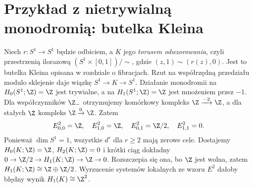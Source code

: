 \section{Przykład z nietrywialną monodromią: butelka Kleina}
Niech $r:S^1\to S^1$ będzie odbiciem, a $K$ jego
\emph{torusem odwzorowania}, czyli przestrzenią ilorazową
$(S^1\times[0,1])/{\sim}$, gdzie $(z,1)\sim(r(z),0)$.
Jest to butelka Kleina opisana w rozdziale o fibracjach.
Rzut na współrzędną przedziału modulo sklejenie daje
wiązkę $S^1\to K\to S^1$. Działanie monodromii
na $H_0(S^1;\Z)=\Z$ jest trywialne, a na
$H_1(S^1;\Z)=\Z$ jest mnożeniem przez $-1$.
Dla współczynników $\Z_-$ otrzymujemy komórkowy kompleks
$\Z\xrightarrow{-2}\Z$, a dla stałych $\Z$
kompleks $\Z\xrightarrow{0}\Z$. Zatem
\[
E^2_{0,0}=\Z,\quad E^2_{1,0}=\Z,\quad
E^2_{0,1}=\Z/2,\quad E^2_{1,1}=0.
\]
Ponieważ $\dim S^1=1$, wszystkie $d^r$ dla $r\ge2$
mają zerowe cele. Dostajemy $H_0(K;\Z)=\Z$,
$H_2(K;\Z)=0$ i krótki ciąg dokładny
$0\to\Z/2\to H_1(K;\Z)\to\Z\to0$.
Rozszczepia się ona, bo $\Z$ jest wolna, zatem
$H_1(K;\Z)\cong\Z\oplus\Z/2$.
Wyrzucenie systemów lokalnych ze wzoru $E^2$ dałoby
błędny wynik $H_1(K)\cong\Z^2$.

